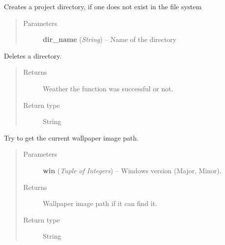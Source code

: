 \documentclass[letterpaper,10pt,english]{sphinxmanual}
\begin{document}

\begin{fulllineitems}
\label{filesystem:filesystem.create_project_directory}
Creates a project directory, if one does not exist in the file system
\begin{quote}\begin{description}
\item[{Parameters}] \leavevmode
\textbf{dir\_name} (\emph{String}) -- Name of the directory

\end{description}\end{quote}

\end{fulllineitems}


\begin{fulllineitems}
\label{filesystem:filesystem.delete_directory}
Deletes a directory.
\begin{quote}\begin{description}
\item[{Returns}] \leavevmode
Weather the function was successful or not.

\item[{Return type}] \leavevmode
String

\end{description}\end{quote}

\end{fulllineitems}


\begin{fulllineitems}
\label{filesystem:filesystem.get_current_wallpaper}
Try to get the current wallpaper image path.
\begin{quote}\begin{description}
\item[{Parameters}] \leavevmode
\textbf{win} (\emph{Tuple of Integers}) -- Windows version (Major, Minor).

\item[{Returns}] \leavevmode
Wallpaper image path if it can find it.

\item[{Return type}] \leavevmode
String

\end{description}\end{quote}

\end{fulllineitems}
\end{document}
